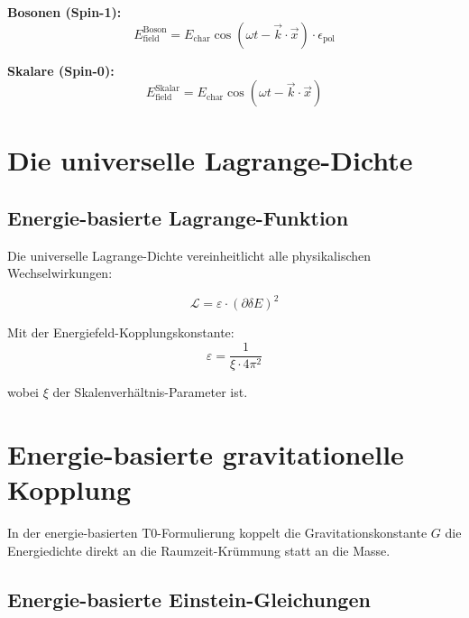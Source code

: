 \documentclass[12pt,a4paper]{report}
\begin{document}
	\textbf{Bosonen (Spin-1):}
	\begin{equation}
		E_{\text{field}}^{\text{Boson}} = E_{\text{char}} \cos(\omega t - \vec{k} \cdot \vec{x}) \cdot \epsilon_{\text{pol}}
	\end{equation}
	
	\textbf{Skalare (Spin-0):}
	\begin{equation}
		E_{\text{field}}^{\text{Skalar}} = E_{\text{char}} \cos(\omega t - \vec{k} \cdot \vec{x})
	\end{equation}
	
	\section{Die universelle Lagrange-Dichte}
	\label{sec:universal_lagrangian}
	
	\subsection{Energie-basierte Lagrange-Funktion}
	\label{subsec:energy_based_lagrangian}
	
	Die universelle Lagrange-Dichte vereinheitlicht alle physikalischen Wechselwirkungen:
	
	\begin{equation}
		\boxed{\mathcal{L} = \varepsilon \cdot (\partial \delta E)^2}
		\label{eq:universal_lagrangian_density}
	\end{equation}
	
	Mit der Energiefeld-Kopplungskonstante:
	\begin{equation}
		\varepsilon = \frac{1}{\xi \cdot 4\pi^2}
	\end{equation}
	
	wobei $\xi$ der Skalenverhältnis-Parameter ist.
	
	\section{Energie-basierte gravitationelle Kopplung}
	\label{sec:energy_gravitational_coupling}
	
	In der energie-basierten T0-Formulierung koppelt die Gravitationskonstante $G$ die Energiedichte direkt an die Raumzeit-Krümmung statt an die Masse.
	
	\subsection{Energie-basierte Einstein-Gleichungen}
	\label{subsec:energy_einstein_equations}
	
\end{document}
